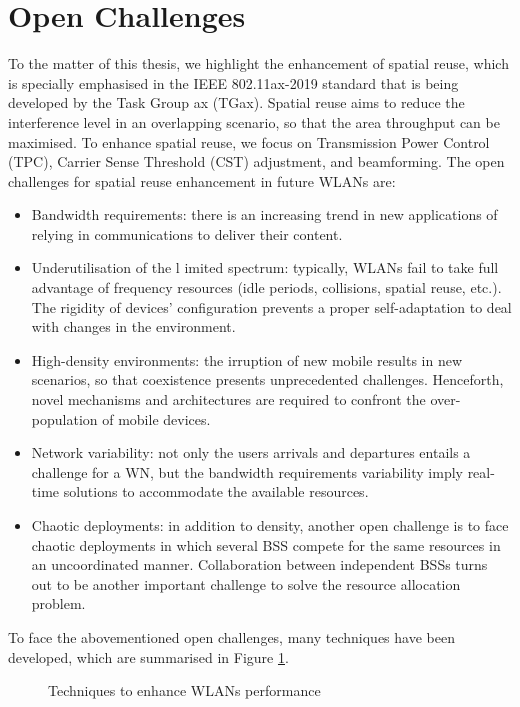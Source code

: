 \documentclass[12pt, a4paper,twoside]{tesi_upf}
\begin{document}
		\section{Open Challenges}
		\label{section:open_challenges}
			To the matter of this thesis, we highlight the enhancement of spatial reuse, which is specially emphasised in the IEEE 802.11ax-2019 standard that is being developed by the Task Group ax (TGax). Spatial reuse aims to reduce the interference level in an overlapping scenario, so that the area throughput can be maximised. To enhance spatial reuse, we focus on Transmission Power Control (TPC), Carrier Sense Threshold (CST) adjustment, and beamforming. The open challenges for spatial reuse enhancement in future WLANs are:
			\begin{itemize}
				\item Bandwidth requirements: there is an increasing trend in new applications of relying in communications to deliver their content.
				\item Underutilisation of the l
				imited spectrum: typically, WLANs fail to take full advantage of frequency resources (idle periods, collisions, spatial reuse, etc.). The rigidity of devices' configuration prevents a proper self-adaptation to deal with changes in the environment.				
				\item High-density environments: the irruption of new mobile results in new scenarios, so that coexistence presents unprecedented challenges. Henceforth, novel mechanisms and architectures are required to confront the over-population of mobile devices. 
				\item Network variability: not only the users arrivals and departures entails a challenge for a WN, but the bandwidth requirements variability imply real-time solutions to accommodate the available resources.
				\item Chaotic deployments: in addition to density, another open challenge is to face chaotic deployments in which several BSS compete for the same resources in an uncoordinated manner. Collaboration between independent BSSs turns out to be another important challenge to solve the resource allocation problem.
			\end{itemize}
			To face the abovementioned open challenges, many techniques have been developed, which are summarised in Figure \ref{fig:techniques_wns}.
			\begin{figure}[h!]
				\centering
				\caption{Techniques to enhance WLANs performance}
				\label{fig:techniques_wns}
			\end{figure}	
		
\end{document}
